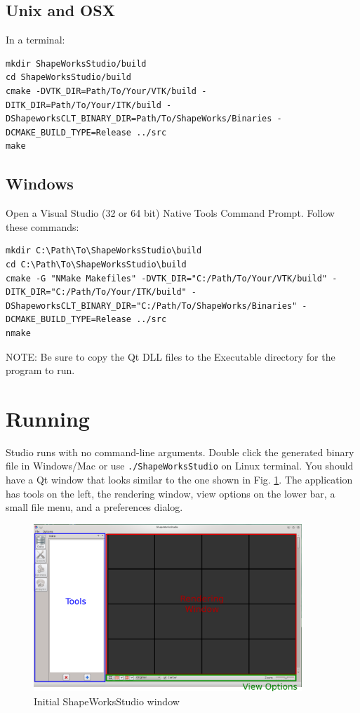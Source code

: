 \documentclass[letterpaper,12pt]{article}   %
\begin{document}
\subsection{Unix and OSX}

In a terminal:

\begin{lstlisting}[style=BashInputStyle]
mkdir ShapeWorksStudio/build
cd ShapeWorksStudio/build
cmake -DVTK_DIR=Path/To/Your/VTK/build -DITK_DIR=Path/To/Your/ITK/build -DShapeworksCLT_BINARY_DIR=Path/To/ShapeWorks/Binaries -DCMAKE_BUILD_TYPE=Release ../src
make
\end{lstlisting}


\subsection{Windows}

Open a Visual Studio (32 or 64 bit) Native Tools Command Prompt. Follow these commands:

\begin{lstlisting}[style=BashInputStyle]
mkdir C:\Path\To\ShapeWorksStudio\build
cd C:\Path\To\ShapeWorksStudio\build
cmake -G "NMake Makefiles" -DVTK_DIR="C:/Path/To/Your/VTK/build" -DITK_DIR="C:/Path/To/Your/ITK/build" -DShapeworksCLT_BINARY_DIR="C:/Path/To/ShapeWorks/Binaries" -DCMAKE_BUILD_TYPE=Release ../src
nmake
\end{lstlisting}

NOTE: Be sure to copy the Qt DLL files to the Executable directory for the program to run.

\section{Running}

Studio runs with no command-line arguments. Double click the generated binary file in Windows/Mac or use \texttt{./ShapeWorksStudio} on Linux terminal.  You should have a Qt window that looks similar to the one shown in Fig. \ref{fig:qtwin}. The application has tools on the left, the rendering window, view options on the lower bar, a small file menu, and a preferences dialog.

\begin{figure}[!htp]
\centering
\includegraphics[width=0.9\textwidth]{figs/qtwin2.png}
\caption{Initial ShapeWorksStudio window}
\label{fig:qtwin}
\end{figure}
\end{document}

